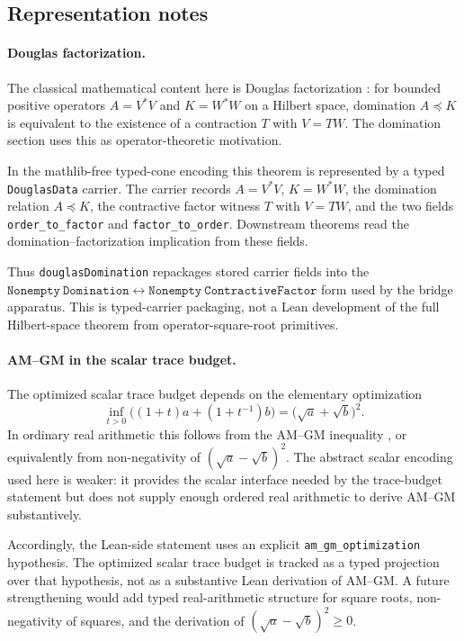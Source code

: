 \documentclass[11pt]{article}
\theoremstyle{definition}
\begin{document}
\subsection*{Representation notes}

\paragraph{Douglas factorization.}
The classical mathematical content here is Douglas factorization
\citep{Douglas1966}: for bounded positive operators \(A=V^*V\) and
\(K=W^*W\) on a Hilbert space, domination \(A\preceq K\) is
equivalent to the existence of a contraction \(T\) with \(V=TW\).
The domination section uses this as operator-theoretic motivation.

In the mathlib-free typed-cone encoding this theorem is represented
by a typed \texttt{DouglasData} carrier.  The carrier records
\(A=V^*V\), \(K=W^*W\), the domination relation \(A\preceq K\), the
contractive factor witness \(T\) with \(V=TW\), and the two fields
\texttt{order\_to\_factor} and \texttt{factor\_to\_order}.  Downstream
theorems read the domination--factorization implication from these
fields.

Thus \texttt{douglasDomination} repackages stored carrier fields into
the
\(\mathtt{Nonempty\ Domination}\leftrightarrow\mathtt{Nonempty\ ContractiveFactor}\)
form used by the bridge apparatus.  This is typed-carrier packaging,
not a Lean development of the full Hilbert-space theorem from
operator-square-root primitives.

\paragraph{AM--GM in the scalar trace budget.}
The optimized scalar trace budget depends on the elementary
optimization
\[
  \inf_{t>0}\bigl((1+t)a+(1+t^{-1})b\bigr)
    = \bigl(\sqrt a+\sqrt b\bigr)^2 .
\]
In ordinary real arithmetic this follows from the AM--GM inequality
\citep{HardyLittlewoodPolya1952}, or equivalently from
non-negativity of \((\sqrt a-\sqrt b)^2\).  The abstract scalar
encoding used here is weaker: it provides the scalar interface
needed by the trace-budget statement but does not supply enough
ordered real arithmetic to derive AM--GM substantively.

Accordingly, the Lean-side statement uses an explicit
\texttt{am\_gm\_optimization} hypothesis.  The optimized scalar trace
budget is tracked as a typed projection over that hypothesis, not as a
substantive Lean derivation of AM--GM.  A future strengthening would
add typed real-arithmetic structure for square roots, non-negativity
of squares, and the derivation of \((\sqrt a-\sqrt b)^2\geq0\).
\end{document}
